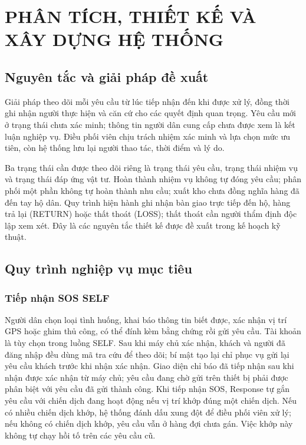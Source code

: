 \documentclass[12pt,a4paper,oneside]{report}
\begin{document}
\chapter{PHÂN TÍCH, THIẾT KẾ VÀ XÂY DỰNG HỆ THỐNG}\label{ch:solution}
\section{Nguyên tắc và giải pháp đề xuất}
Giải pháp theo dõi mỗi yêu cầu từ lúc tiếp nhận đến khi được xử lý, đồng thời ghi nhận người thực hiện và căn cứ cho các quyết định quan trọng. Yêu cầu mới ở trạng thái chưa xác minh; thông tin người dân cung cấp chưa được xem là kết luận nghiệp vụ. Điều phối viên chịu trách nhiệm xác minh và lựa chọn mức ưu tiên, còn hệ thống lưu lại người thao tác, thời điểm và lý do.

Ba trạng thái cần được theo dõi riêng là trạng thái yêu cầu, trạng thái nhiệm vụ và trạng thái đáp ứng vật tư. Hoàn thành nhiệm vụ không tự đóng yêu cầu; phân phối một phần không tự hoàn thành nhu cầu; xuất kho chưa đồng nghĩa hàng đã đến tay hộ dân. Quy trình hiện hành ghi nhận bàn giao trực tiếp đến hộ, hàng trả lại (RETURN) hoặc thất thoát (LOSS); thất thoát cần người thẩm định độc lập xem xét. Đây là các nguyên tắc thiết kế được đề xuất trong kế hoạch kỹ thuật.

\section{Quy trình nghiệp vụ mục tiêu}
\subsection{Tiếp nhận SOS SELF}
Người dân chọn loại tình huống, khai báo thông tin biết được, xác nhận vị trí GPS hoặc ghim thủ công, có thể đính kèm bằng chứng rồi gửi yêu cầu. Tài khoản là tùy chọn trong luồng SELF. Sau khi máy chủ xác nhận, khách và người đã đăng nhập đều dùng mã tra cứu để theo dõi; bí mật tạo lại chỉ phục vụ gửi lại yêu cầu khách trước khi nhận xác nhận. Giao diện chỉ báo đã tiếp nhận sau khi nhận được xác nhận từ máy chủ; yêu cầu đang chờ gửi trên thiết bị phải được phân biệt với yêu cầu đã gửi thành công.
Khi tiếp nhận SOS, Response tự gắn yêu cầu với chiến dịch đang hoạt động nếu vị trí khớp đúng một chiến dịch. Nếu có nhiều chiến dịch khớp, hệ thống đánh dấu xung đột để điều phối viên xử lý; nếu không có chiến dịch khớp, yêu cầu vẫn ở hàng đợi chưa gán. Việc khớp này không tự chạy hồi tố trên các yêu cầu cũ.
\end{document}
